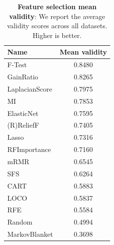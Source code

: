 \begin{table}[ht]
\caption{\textbf{Feature selection mean validity}: We report the average validity scores across all datasets. Higher is better.}
\label{table-results-validity}
\centering
\small
\begin{tabular}{lc}
\toprule
\textbf{Name} & \textbf{Mean validity} \\
\midrule
F-Test & 0.8480 \\
GainRatio & 0.8265 \\
LaplacianScore & 0.7975 \\
MI & 0.7853 \\
ElasticNet & 0.7595 \\
(R)ReliefF & 0.7405 \\
Lasso & 0.7316 \\
RFImportance & 0.7160 \\
mRMR & 0.6545 \\
SFS & 0.6264 \\
CART & 0.5883 \\
LOCO & 0.5837 \\
RFE & 0.5584 \\
Random & 0.4994 \\
MarkovBlanket & 0.3698 \\
\bottomrule
\end{tabular}
\end{table}